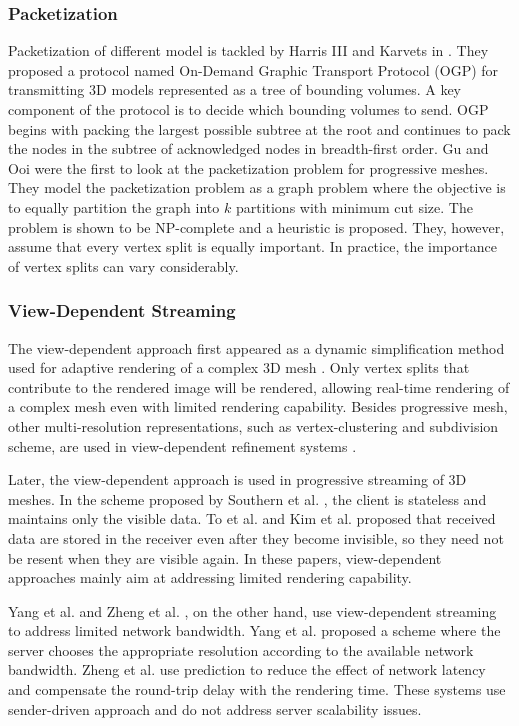 \documentclass[11pt, a4paper]{report}
\begin{document}
    \subsubsection{Packetization}
    Packetization of different model is tackled by
    Harris III and Karvets in \cite{harris:design}.   They proposed
    a protocol named On-Demand Graphic Transport Protocol (OGP)
    for transmitting 3D models represented as a tree of bounding volumes.
    A key component of the protocol is to decide which bounding volumes
    to send.  OGP begins with packing the largest possible subtree at
    the root and continues to pack the nodes in the subtree of
    acknowledged nodes in breadth-first order.  
    Gu and Ooi \cite{Gu:Packetization} were the first to look at
    the packetization problem for progressive meshes.  They model
    the packetization problem as a graph problem where the objective
    is to equally partition the graph into $k$ partitions with minimum
    cut size.  The problem is shown to be NP-complete and a heuristic
    is proposed.  They, however, assume that every vertex split is
    equally important.  In practice, the importance of vertex splits can
    vary considerably.  
    \subsubsection{View-Dependent Streaming}
    The view-dependent approach first appeared as 
    a dynamic simplification method used for adaptive rendering of a complex 3D mesh
    \cite{258843, 258847}. Only vertex splits that contribute to the rendered
    image will be rendered, allowing real-time rendering of a complex mesh
    even with limited rendering capability.
    Besides progressive mesh, other multi-resolution representations, 
    such as vertex-clustering  and subdivision scheme,
    are used in view-dependent refinement systems \cite{245627, efficient:Alliez,602344}.

    Later, the view-dependent approach is used in progressive 
	streaming of 3D meshes.     In the scheme proposed by Southern et al. \cite{363375},  the client is stateless and
    maintains only the visible data. 
    To et al. \cite{To1999}
    and Kim et al. \cite{kim:view} proposed that received data are stored
    in the receiver even after they become invisible, 
    so they need not be resent when they are visible again. 
    In these papers, view-dependent approaches mainly aim at addressing
    limited rendering capability. 
    
    Yang et al. \cite{progressive:Yang} and
     Zheng et al. \cite{zheng:interactive}, on the other hand, use
     view-dependent streaming to address limited network bandwidth.
     Yang et al. proposed a scheme where the server chooses the appropriate resolution
     according to the available network bandwidth.
     Zheng et al. \cite{zheng:interactive} use prediction to
     reduce the effect of network latency and 
     compensate the round-trip delay with the rendering time.
     These systems use sender-driven approach and do not address
     server scalability issues.
\end{document}
